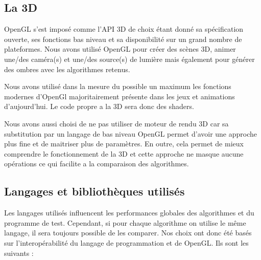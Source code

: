 \documentclass[a4paper,10pt]{report}
\begin{document}
\subsection{La 3D}

OpenGL s'est imposé comme l'API 3D de choix étant donné sa spécification ouverte, ses fonctions bas niveau et sa disponibilité sur un grand nombre de plateformes.
Nous avons utilisé OpenGL pour créer des scènes 3D, animer une/des caméra(s) et une/des source(s) de lumière mais également pour générer des ombres avec les algorithmes retenus.

Nous avons utilisé dans la mesure du possible un maximum les fonctions modernes d'OpenGl majoritairement présente dans les jeux et animations d'aujourd'hui. Le code propre a la 3D sera donc des shaders.

Nous avons aussi choisi de ne pas utiliser de moteur de rendu 3D car sa substitution par un langage de bas niveau OpenGL permet d'avoir une approche plus fine et de maitriser plus de paramètres. En outre, cela permet de mieux comprendre le fonctionnement de la 3D et cette approche ne masque aucune opérations ce qui facilite a la comparaison des algorithmes.

\subsection{Langages et bibliothèques utilisés}

Les langages utilisés influencent les performances globales des algorithmes et du programme de test. Cependant, si pour chaque algorithme on utilise le m\^eme langage, il sera toujours possible de les comparer. Nos choix ont donc été basés sur l'interopérabilité du langage de programmation et de OpenGL. Ils sont les suivants :
\end{document}
